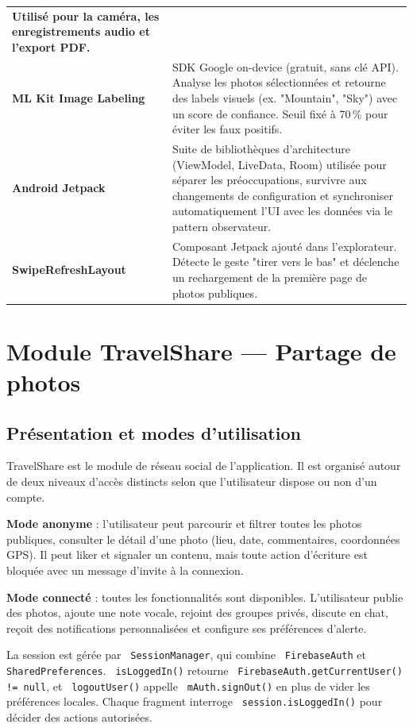 \documentclass[a4paper,12pt,openany]{report}
\newcommand{\ic}[1]{\texttt{\small\colorbox{lightbg}{\color{navy!90} #1}}}
\begin{document}
\begin{tabularx}{\textwidth}{>{\bfseries}l X}
      Utilisé pour la caméra, les enregistrements audio et l'export PDF. \\
  ML Kit Image Labeling
    & SDK Google on-device (gratuit, sans clé API). Analyse les photos sélectionnées
      et retourne des labels visuels (ex. "Mountain", "Sky") avec un score de
      confiance. Seuil fixé à 70\,\% pour éviter les faux positifs. \\
  Android Jetpack
    & Suite de bibliothèques d'architecture (ViewModel, LiveData, Room) utilisée pour
      séparer les préoccupations, survivre aux changements de configuration et synchroniser
      automatiquement l'UI avec les données via le pattern observateur. \\
  SwipeRefreshLayout
    & Composant Jetpack ajouté dans l'explorateur. Détecte le geste "tirer vers le bas"
      et déclenche un rechargement de la première page de photos publiques. \\
  \bottomrule
\end{tabularx}


\chapter{Module TravelShare — Partage de photos}

\section{Présentation et modes d'utilisation}

TravelShare est le module de réseau social de l'application. Il est organisé
autour de deux niveaux d'accès distincts selon que l'utilisateur dispose ou
non d'un compte.

\textbf{Mode anonyme} : l'utilisateur peut parcourir et filtrer toutes les
photos publiques, consulter le détail d'une photo (lieu, date, commentaires,
coordonnées GPS). Il peut liker et signaler un contenu, mais toute action
d'écriture est bloquée avec un message d'invite à la connexion.

\textbf{Mode connecté} : toutes les fonctionnalités sont disponibles.
L'utilisateur publie des photos, ajoute une note vocale, rejoint des groupes
privés, discute en chat, reçoit des notifications personnalisées et configure
ses préférences d'alerte.

La session est gérée par \ic{SessionManager}, qui combine \ic{FirebaseAuth} et
\ic{SharedPreferences}. \ic{isLoggedIn()} retourne \ic{FirebaseAuth.getCurrentUser() != null},
et \ic{logoutUser()} appelle \ic{mAuth.signOut()} en plus de vider les préférences locales.
Chaque fragment interroge \ic{session.isLoggedIn()} pour décider des actions autorisées.
\end{document}
